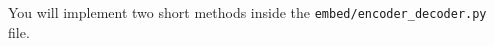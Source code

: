 You will implement two short methods inside the \texttt{embed/encoder\_decoder.py} file.

\begin{enumerate}[(a)]
    
    
    
    
    
    
\end{enumerate}
